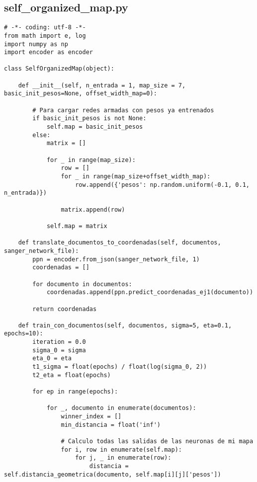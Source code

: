 \newpage
\subsection{self\_organized\_map.py}

\begin{changemargin}{-2.0cm}{-1.5cm} 
\begin{verbatim}
# -*- coding: utf-8 -*-
from math import e, log
import numpy as np
import encoder as encoder

class SelfOrganizedMap(object):

    def __init__(self, n_entrada = 1, map_size = 7, basic_init_pesos=None, offset_width_map=0):

        # Para cargar redes armadas con pesos ya entrenados
        if basic_init_pesos is not None:
            self.map = basic_init_pesos
        else:
            matrix = []

            for _ in range(map_size):
                row = []
                for _ in range(map_size+offset_width_map):
                    row.append({'pesos': np.random.uniform(-0.1, 0.1, n_entrada)})

                matrix.append(row)

            self.map = matrix

    def translate_documentos_to_coordenadas(self, documentos, sanger_network_file):
        ppn = encoder.from_json(sanger_network_file, 1)
        coordenadas = []

        for documento in documentos:
            coordenadas.append(ppn.predict_coordenadas_ej1(documento))

        return coordenadas

    def train_con_documentos(self, documentos, sigma=5, eta=0.1, epochs=10):
        iteration = 0.0
        sigma_0 = sigma
        eta_0 = eta
        t1_sigma = float(epochs) / float(log(sigma_0, 2))
        t2_eta = float(epochs)

        for ep in range(epochs):
            
            for _, documento in enumerate(documentos):
                winner_index = []
                min_distancia = float('inf')

                # Calculo todas las salidas de las neuronas de mi mapa
                for i, row in enumerate(self.map):
                    for j, _ in enumerate(row):
                        distancia = self.distancia_geometrica(documento, self.map[i][j]['pesos'])


\end{verbatim}
\end{changemargin}
